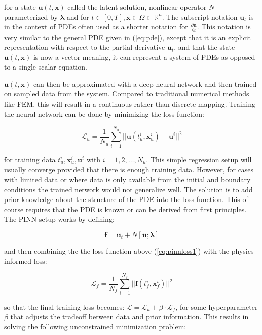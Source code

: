 \noindent for a state $\bm{u}(t, \bm{x})$ called the latent solution, nonlinear operator $N$ parameterized by $\bm{\lambda}$ and for $t \in [0, T], \bm{x} \in \Omega \subset \mathbb{R}^n$. The subscript notation $\bm{u}_t$ is in the context of PDEs often used as a shorter notation for $\frac{\partial \bm{u}}{\partial t}$. This notation is very similar to the general PDE given in (\ref{eq:pde}), except that it is an explicit representation with respect to the partial derivative $\bm{u}_t$, and that the state $\bm{u}(t, \bm{x})$ is now a vector meaning, it can represent a system of PDEs as opposed to a single scalar equation.

$\bm{u}(t, \bm{x})$ can then be approximated with a deep neural network and then trained on sampled data from the system. Compared to traditional numerical methods like FEM, this will result in a continuous rather than discrete mapping. Training the neural network can be done by minimizing the loss function:

\begin{equation}
    \mathcal{L}_u = \frac{1}{N_u} \sum_{i = 1}^{N_u} || \bm{u}(t_u^i, \bm{x}_u^i) - \bm{u}^i ||^2
    \label{eq:pinnloss1}
\end{equation}

\noindent for training data $t_u^i, \bm{x}_u^i, \bm{u}^i$ with $i = 1, 2, \dots, N_u$. This simple regression setup will usually converge provided that there is enough training data. However, for cases with limited data or where data is only available from the initial and boundary conditions the trained network would not generalize well. The solution is to add prior knowledge about the structure of the PDE into the loss function. This of course requires that the PDE is known or can be derived from first principles. The PINN setup works by defining:

\begin{equation}
    \bm{f} = \bm{u}_t + N[\bm{u}; \bm{\lambda}]
    \label{eq:pinnf}
\end{equation}

\noindent and then combining the the loss function above (\ref{eq:pinnloss1}) with the physics informed loss:

\begin{equation}
    \mathcal{L}_f = \frac{1}{N_f} \sum_{i = 1}^{N_f} || \bm{f}(t_f^i, \bm{x}_f^i) ||^2
    \label{eq:pinnloss2}
\end{equation}

\noindent so that the final training loss becomes: $\mathcal{L} = \mathcal{L}_u + \beta \cdot \mathcal{L}_f$, for some hyperparameter $\beta$ that adjusts the tradeoff between data and prior information. This results in solving the following unconstrained minimization problem:

